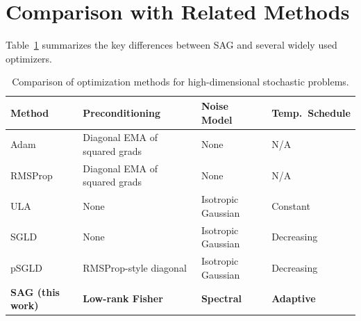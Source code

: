 \section{Comparison with Related Methods}

Table~\ref{tab:comparison} summarizes the key differences between SAG and several widely used optimizers.

\begin{table}[htbp]
\centering
\caption{Comparison of optimization methods for high-dimensional stochastic problems.}
\label{tab:comparison}
\begin{tabularx}{0.92\textwidth}{lXXX}
\toprule
\textbf{Method} & \textbf{Preconditioning} & \textbf{Noise Model} & \textbf{Temp.\ Schedule} \\
\midrule
Adam \cite{kingma2014} & Diagonal EMA of squared grads & None & N/A \\
RMSProp \cite{tieleman2012} & Diagonal EMA of squared grads & None & N/A \\
ULA \cite{roberts1996} & None & Isotropic Gaussian & Constant \\
SGLD \cite{welling2011} & None & Isotropic Gaussian & Decreasing \\
pSGLD \cite{ahn2012} & RMSProp-style diagonal & Isotropic Gaussian & Decreasing \\
\textbf{SAG (this work)} & \textbf{Low-rank Fisher} & \textbf{Spectral} & \textbf{Adaptive} \\
\bottomrule
\end{tabularx}
\end{table}
